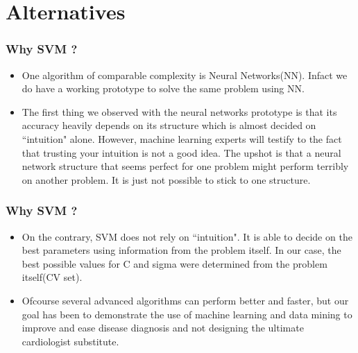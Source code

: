 \documentclass[11pt,xcolor=dvipsnames]{beamer}
\begin{document}
\section{Alternatives}	
\begin{frame}
\frametitle{Why SVM ?}
\begin{itemize}
\item One algorithm of comparable complexity is Neural Networks(NN). Infact we do have a working prototype to solve the same problem using NN.\\ 
\item The first thing we observed with the neural networks prototype is that its accuracy heavily depends on its structure which is almost decided on ``intuition" alone. However, machine learning experts will testify to the fact that trusting your intuition is not a good idea. The upshot is that a neural network structure that seems perfect for one problem might perform terribly on another problem. It is just not possible to stick to one structure.\\
\end{itemize}
\end{frame}



\begin{frame}
\frametitle{Why SVM ?}
\begin{itemize}
\item On the contrary, SVM does not rely on ``intuition". It is able to decide on the best parameters using information from the problem itself. In our case, the best possible values for C and sigma were determined from the problem itself(CV set). 
\item Ofcourse several advanced algorithms can perform better and faster, but our goal has been to demonstrate the use of machine learning and data mining to improve and ease disease diagnosis and not designing the ultimate cardiologist substitute. 
\end{itemize}
\end{frame}




\end{document}
